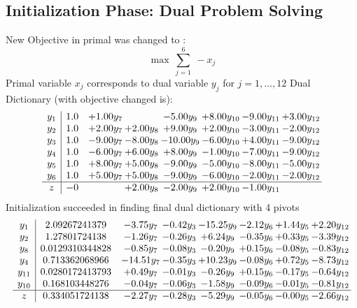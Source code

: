 \documentclass[9pt]{article}
\begin{document}
\subsection{Initialization Phase: Dual Problem Solving}
New Objective in primal was changed to : \[ \max\ \sum_{j=1}^{6}\ - x_j \] 
Primal variable $x_j$ corresponds to dual variable $y_j$ for $j = 1,\ldots,12$
Dual Dictionary (with objective changed is): 
\[\begin{array}{c| c c@{\hskip 2pt} c@{\hskip 2pt} c@{\hskip 2pt} c@{\hskip 2pt} c@{\hskip 2pt} c@{\hskip 2pt} }
 y_{1}   &  1.0 & +  1.00 y_{7} &   & -5.00 y_{9} & +  8.00 y_{10} & -9.00 y_{11} & +  3.00 y_{12}\\
 y_{2}   &  1.0 & +  2.00 y_{7} & +  2.00 y_{8} & +  9.00 y_{9} & +  2.00 y_{10} & -3.00 y_{11} & -2.00 y_{12}\\
 y_{3}   &  1.0 & -9.00 y_{7} & -8.00 y_{8} & -10.00 y_{9} & -6.00 y_{10} & +  4.00 y_{11} & -9.00 y_{12}\\
 y_{4}   &  1.0 & -6.00 y_{7} & +  6.00 y_{8} & +  8.00 y_{9} & -1.00 y_{10} & -7.00 y_{11} & -9.00 y_{12}\\
 y_{5}   &  1.0 & +  8.00 y_{7} & +  5.00 y_{8} & -9.00 y_{9} & -5.00 y_{10} & -8.00 y_{11} & -5.00 y_{12}\\
 y_{6}   &  1.0 & +  5.00 y_{7} & +  5.00 y_{8} & -9.00 y_{9} & -6.00 y_{10} & -2.00 y_{11} & -2.00 y_{12}\\
\hline
z    &  -0  &   & +  2.00 y_{8} & -2.00 y_{9} & +  2.00 y_{10} & -1.00 y_{11} &   \\
\end{array}\]
Initialization succeeded in finding final dual dictionary with 4 pivots
\[\begin{array}{c| c c@{\hskip 2pt} c@{\hskip 2pt} c@{\hskip 2pt} c@{\hskip 2pt} c@{\hskip 2pt} c@{\hskip 2pt} }
 y_{1}   &  2.09267241379 & -3.75 y_{7} & -0.42 y_{3} & -15.25 y_{9} & -2.12 y_{6} & +  1.44 y_{5} & +  2.20 y_{12}\\
 y_{2}   &  1.27801724138 & -1.26 y_{7} & -0.26 y_{3} & +  6.24 y_{9} & -0.35 y_{6} & +  0.33 y_{5} & -3.39 y_{12}\\
 y_{8}   &  0.0129310344828 & -0.85 y_{7} & -0.08 y_{3} & -0.20 y_{9} & +  0.15 y_{6} & -0.08 y_{5} & -0.83 y_{12}\\
 y_{4}   &  0.713362068966 & -14.51 y_{7} & -0.35 y_{3} & + 10.23 y_{9} & -0.08 y_{6} & +  0.72 y_{5} & -8.73 y_{12}\\
 y_{11}   &  0.0280172413793 & +  0.49 y_{7} & -0.01 y_{3} & -0.26 y_{9} & +  0.15 y_{6} & -0.17 y_{5} & -0.64 y_{12}\\
 y_{10}   &  0.168103448276 & -0.04 y_{7} & -0.06 y_{3} & -1.58 y_{9} & -0.09 y_{6} & -0.01 y_{5} & -0.81 y_{12}\\
\hline
z    &  0.334051724138 & -2.27 y_{7} & -0.28 y_{3} & -5.29 y_{9} & -0.05 y_{6} & -0.00 y_{5} & -2.66 y_{12}\\
\end{array}\]
\end{document}
